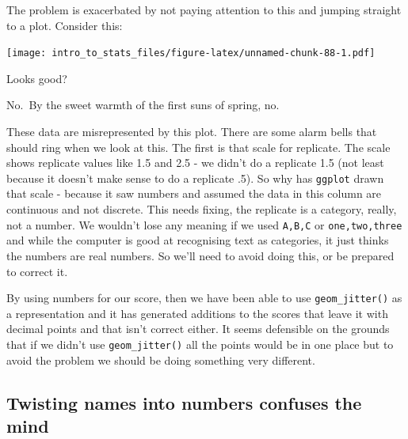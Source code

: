 \documentclass[
]{book}
\newenvironment{Shaded}{\begin{snugshade}}{\end{snugshade}}
\newcommand{\DataTypeTok}[1]{\textcolor[rgb]{0.13,0.29,0.53}{#1}}
\newcommand{\KeywordTok}[1]{\textcolor[rgb]{0.13,0.29,0.53}{\textbf{#1}}}
\newcommand{\NormalTok}[1]{#1}
\newcommand{\OperatorTok}[1]{\textcolor[rgb]{0.81,0.36,0.00}{\textbf{#1}}}
\newcommand{\StringTok}[1]{\textcolor[rgb]{0.31,0.60,0.02}{#1}}
\newenvironment{sidenote}
{ \begin{tcolorbox}[colbacktitle=blue!50!white,
title=huh?,coltitle=white,
fonttitle=\bfseries] }
{  \end{tcolorbox} }
\begin{document}
The problem is exacerbated by not paying attention to this and jumping straight to a plot. Consider this:

\begin{Shaded}
\end{Shaded}

\texttt{[image: intro\_to\_stats\_files/figure-latex/unnamed-chunk-88-1.pdf]}

Looks good?

No.~By the sweet warmth of the first suns of spring, no.

These data are misrepresented by this plot. There are some alarm bells that should ring when we look at this. The first is that scale for replicate. The scale shows replicate values like 1.5 and 2.5 - we didn't do a replicate 1.5 (not least because it doesn't make sense to do a replicate .5). So why has \texttt{ggplot} drawn that scale - because it saw numbers and assumed the data in this column are continuous and not discrete. This needs fixing, the replicate is a category, really, not a number. We wouldn't lose any meaning if we used \texttt{A,B,C} or \texttt{one,two,three} and while the computer is good at recognising text as categories, it just thinks the numbers are real numbers. So we'll need to avoid doing this, or be prepared to correct it.

\begin{sidenote}
By using numbers for our score, then we have been able to use \texttt{geom\_jitter()} as a representation and it has generated additions to the scores that leave it with decimal points and that isn't correct either. It seems defensible on the grounds that if we didn't use \texttt{geom\_jitter()} all the points would be in one place but to avoid the problem we should be doing something very different.
\end{sidenote}

\hypertarget{twisting-names-into-numbers-confuses-the-mind}{%
\subsection{Twisting names into numbers confuses the mind}\label{twisting-names-into-numbers-confuses-the-mind}}
\end{document}
